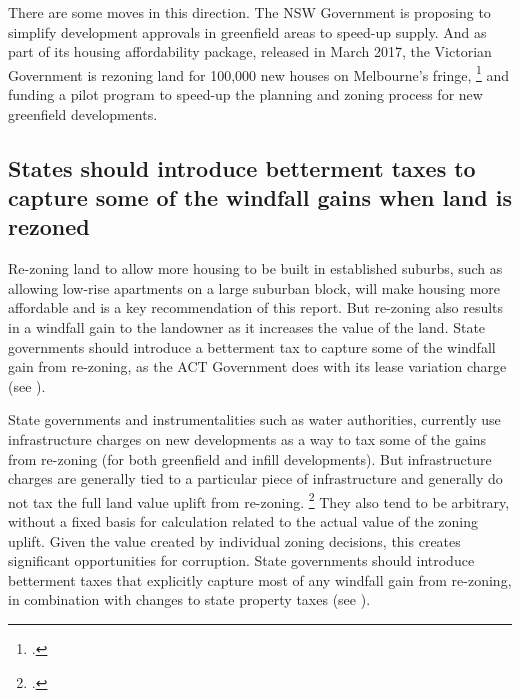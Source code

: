 There are some moves in this direction.
The NSW Government is proposing to simplify development approvals in greenfield areas to speed-up supply.
And as part of its housing affordability package, released in March 2017, the Victorian Government is rezoning land for 100,000 new houses on Melbourne's fringe,%
	\footcite{VicStateGov2017Homes}
and funding a pilot program to speed-up the planning and zoning process for new greenfield developments.


\subsection{States should introduce betterment taxes to capture some of the windfall gains when land is rezoned}\label{subsec:states-should-caputure-windfall-gains-zoning}

Re-zoning land to allow more housing to be built in established suburbs, such as allowing low-rise apartments on a large suburban block, will make housing more affordable and is a key recommendation of this report.
But re-zoning also results in a windfall gain to the landowner as it increases the value of the land. State governments should introduce a betterment tax to capture some of the windfall gain from re-zoning, as the ACT Government does with its lease variation charge (see ).

State governments and instrumentalities such as water authorities, currently use infrastructure charges on new developments as a way to tax some of the gains from re-zoning (for both greenfield and infill developments).
But infrastructure charges are generally tied to a particular piece of infrastructure and generally do not tax the full land value uplift from re-zoning.%
    \footcites[][11]{Terrill-Emslie-2017-Value-capture}[][10]{SGS2016__tech_paper_value_capture}
They also tend to be arbitrary, without a fixed basis for calculation related to the actual value of the zoning uplift.
Given the value created by individual zoning decisions, this creates significant opportunities for corruption.
State governments should introduce betterment taxes that explicitly capture most of any windfall gain from re-zoning, in combination with changes to state property taxes (see ).

